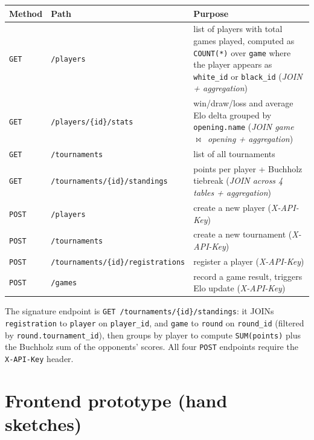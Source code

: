 \documentclass[11pt,a4paper]{article}
\begin{document}
\renewcommand{\arraystretch}{1.2}
\begin{tabularx}{\linewidth}{@{}p{1.6cm}p{4.6cm}X@{}}
\toprule
\textbf{Method} & \textbf{Path} & \textbf{Purpose} \\
\midrule
\texttt{GET}  & \texttt{/players}                              & list of players with total games played, computed as \texttt{COUNT(*)} over \texttt{game} where the player appears as \texttt{white\_id} or \texttt{black\_id} (\emph{JOIN + aggregation}) \\
\texttt{GET}  & \texttt{/players/\{id\}/stats}                 & win/draw/loss and average Elo delta grouped by \texttt{opening.name} (\emph{JOIN game~$\bowtie$~opening + aggregation}) \\
\texttt{GET}  & \texttt{/tournaments}                          & list of all tournaments \\
\texttt{GET}  & \texttt{/tournaments/\{id\}/standings}         & points per player + Buchholz tiebreak (\emph{JOIN across 4 tables + aggregation}) \\
\texttt{POST} & \texttt{/players}                              & create a new player (\emph{X-API-Key}) \\
\texttt{POST} & \texttt{/tournaments}                          & create a new tournament (\emph{X-API-Key}) \\
\texttt{POST} & \texttt{/tournaments/\{id\}/registrations}     & register a player (\emph{X-API-Key}) \\
\texttt{POST} & \texttt{/games}                                & record a game result, triggers Elo update (\emph{X-API-Key}) \\
\bottomrule
\end{tabularx}

The signature endpoint is \texttt{GET /tournaments/\{id\}/standings}: it JOINs
\texttt{registration} to \texttt{player} on \texttt{player\_id}, and
\texttt{game} to \texttt{round} on \texttt{round\_id} (filtered by
\texttt{round.tournament\_id}), then groups by player to compute
\texttt{SUM(points)} plus the Buchholz sum of the opponents' scores. All four
\texttt{POST} endpoints require the \texttt{X-API-Key} header.

\section{Frontend prototype (hand sketches)}
\end{document}
